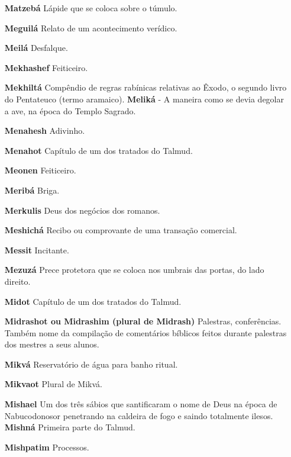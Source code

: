 \begin{itemize}
\begin{enumrate}
\begin{itemize}
\begin{itemize}
\begin{itemize}
\begin{itemize}
\begin{itemize}
\item[\textbf{Matzebá}] Lápide que se coloca sobre o túmulo.

\item[\textbf{Meguilá}] Relato de um acontecimen­to verídico.


\item[\textbf{Meilá}] Desfalque.

\item[\textbf{Mekhashef}] Feiticeiro.

\item[\textbf{Mekhiltá}] Compêndio de regras rabí­nicas relativas ao Êxodo, o
segundo li­vro do Pentateuco (termo aramaico). \textbf{Meliká} - A
maneira como se devia dego­lar a ave, na época do Templo Sagrado.
\item[\textbf{Menahesh}] Adivinho.

\item[\textbf{Menahot}] Capítulo de um dos trata­dos do Talmud.

\item[\textbf{Meonen}] Feiticeiro.

\item[\textbf{Meribá}] Briga.

\item[\textbf{Merkulis}] Deus dos negócios dos ro­manos.

\item[\textbf{Meshichá}] Recibo ou comprovante de uma transação comercial.

\item[\textbf{Messit}] Incitante.

\item[\textbf{Mezuzá}] Prece protetora que se co­loca nos umbrais das portas,
do lado direito.

\item[\textbf{Midot}] Capítulo de um dos tratados do Talmud.

\item[\textbf{Midrashot ou Midrashim (plural de Midrash)}] Palestras,
conferências. Também nome da compilação de co­mentários bíblicos feitos
durante pales­tras dos mestres a seus alunos.

\item[\textbf{Mikvá}] Reservatório de água para ba­nho ritual.

\item[\textbf{Mikvaot}] Plural de Mikvá.

\item[\textbf{Mishael}] Um dos três sábios que san­tificaram o nome de Deus
na época de Nabucodonosor penetrando na caldei­ra de fogo e saindo
totalmente ilesos. \textbf{Mishná} Primeira parte do Talmud.
\item[\textbf{Mishpatim}] Processos.


\end{itemize}
\end{itemize}
\end{itemize}
\end{itemize}
\end{itemize}
\end{enumrate}
\end{itemize}
